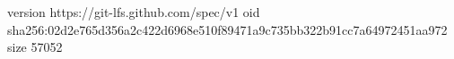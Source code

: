 version https://git-lfs.github.com/spec/v1
oid sha256:02d2e765d356a2c422d6968e510f89471a9c735bb322b91cc7a64972451aa972
size 57052
